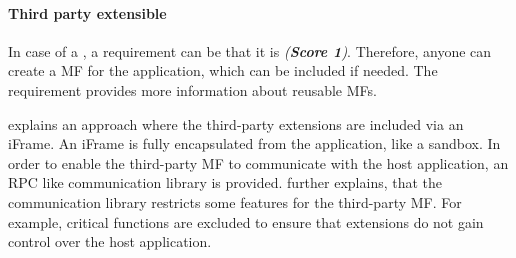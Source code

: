 \paragraph{Third party extensible}\label{cha:requirement_detail_integration_extensible}

In case of a , a requirement can be that it is  \textit{ (\textbf{Score 1})}.
Therefore, anyone can create a \ac{MF} for the application, which can be included if needed.
The requirement \textit{} provides more information about reusable \acp{MF}.

\textcite{Grijzen.2019} explains an approach where the third-party extensions are included via an iFrame.
An iFrame is fully encapsulated from the application, like a sandbox.
In order to enable the third-party \ac{MF} to communicate with the host application, an \ac{RPC} like communication library is provided.
\citeauthor{Grijzen.2019} further explains, that the communication library restricts some features for the third-party \ac{MF}.
For example, critical functions are excluded to ensure that extensions do not gain control over the host application.
